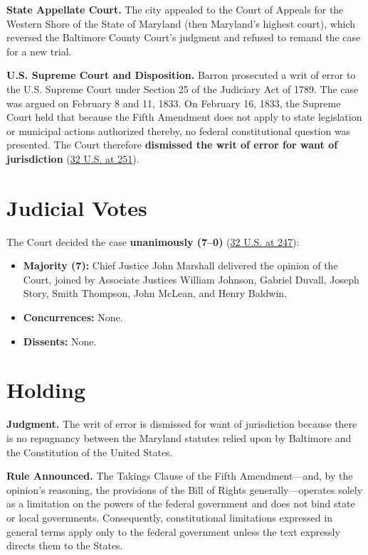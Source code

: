 \documentclass[12pt]{article}
\begin{document}
\textbf{State Appellate Court.} The city appealed to the Court of Appeals for the Western Shore of the State of Maryland (then Maryland's highest court), which reversed the Baltimore County Court's judgment and refused to remand the case for a new trial.

\textbf{U.S. Supreme Court and Disposition.} Barron prosecuted a writ of error to the U.S. Supreme Court under Section 25 of the Judiciary Act of 1789. The case was argued on February 8 and 11, 1833. On February 16, 1833, the Supreme Court held that because the Fifth Amendment does not apply to state legislation or municipal actions authorized thereby, no federal constitutional question was presented. The Court therefore \textbf{dismissed the writ of error for want of jurisdiction} (\href{https://supreme.justia.com/cases/federal/us/32/243/}{32 U.S. at 251}).

\section{Judicial Votes}

The Court decided the case \textbf{unanimously (7--0)} (\href{https://supreme.justia.com/cases/federal/us/32/243/}{32 U.S. at 247}):

\begin{itemize}
  \item \textbf{Majority (7):} Chief Justice John Marshall delivered the opinion of the Court, joined by Associate Justices William Johnson, Gabriel Duvall, Joseph Story, Smith Thompson, John McLean, and Henry Baldwin.
  \item \textbf{Concurrences:} None.
  \item \textbf{Dissents:} None.
\end{itemize}

\section{Holding}

\textbf{Judgment.} The writ of error is dismissed for want of jurisdiction because there is no repugnancy between the Maryland statutes relied upon by Baltimore and the Constitution of the United States.

\textbf{Rule Announced.} The Takings Clause of the Fifth Amendment---and, by the opinion's reasoning, the provisions of the Bill of Rights generally---operates solely as a limitation on the powers of the federal government and does not bind state or local governments. Consequently, constitutional limitations expressed in general terms apply only to the federal government unless the text expressly directs them to the States.
\end{document}
